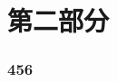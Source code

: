 \documentclass[10pt,mathserif]{beamer}%
\begin{document}
\part{第二部分}

\section{456}
\begin{frame}[fragile]
    \frametitle{\hei{\currentdeepesttitle}}
    \begin{spacing}{1.5} \begin{heienv}
    \setlength{\parindent}{2em}
        
    \end{heienv} \end{spacing}
\end{frame}




{\xdbg
\begin{frame}
\end{frame}}
\end{document}
